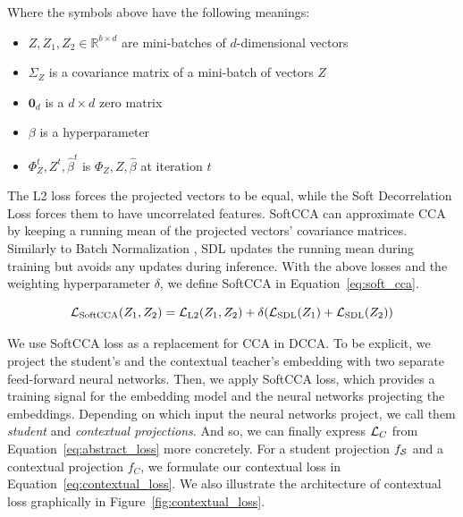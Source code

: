 Where the symbols above have the following meanings:

\begin{itemize}

  \item $Z, Z_1, Z_2 \in \mathbb{R}^{b \times d}$ are mini-batches of
    $d$-dimensional vectors

  \item $\Sigma_{Z}$ is a covariance matrix of a mini-batch of vectors $Z$

  \item $\bm{0}_d$ is a $d \times d$ zero matrix

  \item $\beta$ is a hyperparameter

  \item $\Phi_Z^t, Z^t, \hat{\beta}^t$ is $\Phi_Z, Z, \hat{\beta}$ at iteration
    $t$

\end{itemize}

The L2 loss forces the projected vectors to be equal, while the Soft
Decorrelation Loss forces them to have uncorrelated features. SoftCCA can approximate CCA by keeping a running mean of the projected vectors' covariance matrices. Similarly to Batch Normalization \citep{ioffe2015batch},
SDL updates the running mean during training but avoids any updates during
inference. With the above losses and the weighting hyperparameter $\delta$, we
define SoftCCA in Equation~\ref{eq:soft_cca}.

\begin{equation}\label{eq:soft_cca}
  \mathcal{L}_{\text{SoftCCA}}(Z_1, Z_2) = \mathcal{L}_{\text{L2}}(Z_1, Z_2) +
      \delta ( \mathcal{L}_{\text{SDL}}(Z_1) + \mathcal{L}_{\text{SDL}}(Z_2) )
\end{equation}

We use SoftCCA loss as a replacement for CCA in DCCA. To be explicit, we
project the student's and the contextual teacher's embedding with two separate
feed-forward neural networks. Then, we apply SoftCCA loss, which provides a
training signal for the embedding model and the neural networks projecting the
embeddings. Depending on which input the neural networks project, we call them
\emph{student} and \emph{contextual projections}. And so, we can finally express $\mathcal{L}_C$ from
Equation~\ref{eq:abstract_loss} more concretely. For a student projection
$f_{\mathcal{S}}$ and a contextual projection $f_C$, we formulate our contextual
loss in Equation~\ref{eq:contextual_loss}. We also illustrate the architecture
of contextual loss graphically in Figure~\ref{fig:contextual_loss}.

